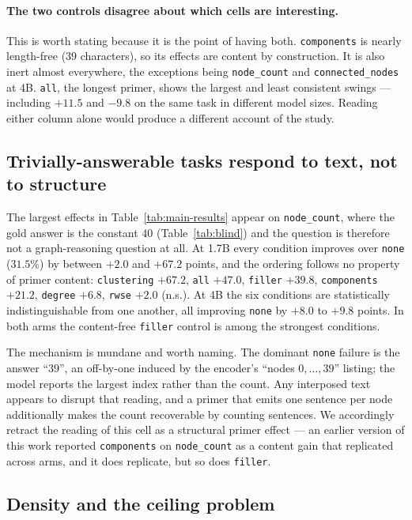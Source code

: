 \documentclass[11pt]{article}
\begin{document}
\paragraph{The two controls disagree about which cells are interesting.}
This is worth stating because it is the point of having both.
\texttt{components} is nearly length-free ($39$ characters), so its effects
are content by construction. It is also inert almost everywhere, the
exceptions being \texttt{node\_count} and \texttt{connected\_nodes} at 4B.
\texttt{all}, the longest primer, shows the largest and least consistent
swings --- including $+11.5$ and $-9.8$ on the same task in different model
sizes. Reading either column alone would produce a different account of the
study.

\subsection{Trivially-answerable tasks respond to text, not to structure}
\label{sec:results-nodecount}

The largest effects in Table~\ref{tab:main-results} appear on
\texttt{node\_count}, where the gold answer is the constant $40$
(Table~\ref{tab:blind}) and the question is therefore not a
graph-reasoning question at all. At 1.7B every condition improves over
\texttt{none} ($31.5\%$) by between $+2.0$ and $+67.2$ points, and the
ordering follows no property of primer content: \texttt{clustering}
$+67.2$, \texttt{all} $+47.0$, \texttt{filler} $+39.8$, \texttt{components}
$+21.2$, \texttt{degree} $+6.8$, \texttt{rwse} $+2.0$ (n.s.). At 4B the six
conditions are statistically indistinguishable from one another, all
improving \texttt{none} by $+8.0$ to $+9.8$ points. In both arms the
content-free \texttt{filler} control is among the strongest conditions.

The mechanism is mundane and worth naming. The dominant \texttt{none}
failure is the answer ``$39$'', an off-by-one induced by the encoder's
``nodes $0, \dots, 39$'' listing; the model reports the largest index
rather than the count. Any interposed text appears to disrupt that
reading, and a primer that emits one sentence per node additionally makes
the count recoverable by counting sentences. We accordingly retract the
reading of this cell as a structural primer effect --- an earlier version
of this work reported \texttt{components} on \texttt{node\_count} as a
content gain that replicated across arms, and it does replicate, but so
does \texttt{filler}.

\subsection{Density and the ceiling problem}
\label{sec:results-density}
\end{document}
